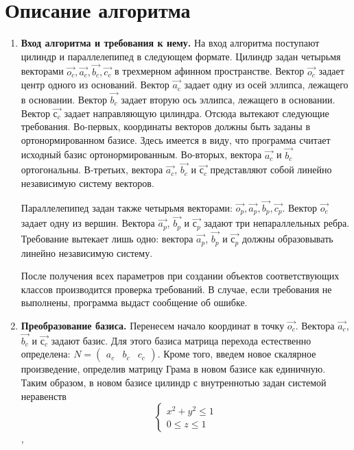 \documentclass[pdftex,ptm,12pt,a4paper]{report}
\begin{document}
\chapter{Описание алгоритма}
\begin{enumerate}
  \item 
      \textbf{Вход алгоритма и требования к нему.}
      На вход алгоритма поступают цилиндр и параллелепипед в следующем формате.
      Цилиндр задан четырьмя векторами $\vec{o_c}, \vec{a_c}, \vec{b_c}, \vec{c_c}$ в трехмерном афинном пространстве.
      Вектор $\vec{o_c}$ задает центр одного из оснований.
      Вектор $\vec{a_c}$ задает одну из осей эллипса, лежащего в основании.
      Вектор $\vec{b_c}$ задает вторую ось эллипса, лежащего в основании.
      Вектор $\vec{с_c}$ задает направляющую цилиндра.
      Отсюда вытекают следующие требования.
      Во-первых, координаты векторов должны быть заданы в ортонормированном базисе. 
      Здесь имеется в виду, что программа считает исходный базис ортонормированным.
      Во-вторых, вектора $\vec{a_c}$ и $\vec{b_c}$ ортогональны.
      В-третьих, вектора $\vec{a_c}$, $\vec{b_c}$ и $\vec{с_c}$ представляют собой линейно независимую систему векторов.

      Параллелепипед задан также четырьмя векторами: $\vec{o_p}, \vec{a_p}, \vec{b_p}, \vec{c_p}$.
      Вектор $\vec{o_c}$ задает одну из вершин.
      Вектора $\vec{a_p}$, $\vec{b_p}$ и $\vec{с_p}$ задают три непараллельных ребра.
      Требование вытекает лишь одно: вектора $\vec{a_p}$, $\vec{b_p}$ и $\vec{с_p}$ должны образовывать линейно независимую систему.

      После получения всех параметров при создании объектов соответствующих классов производится проверка требований. 
      В случае, если требования не выполнены, программа выдаст сообщение об ошибке.
  \item
    \textbf{Преобразование базиса.}
      Перенесем начало координат в точку $\vec{o_c}$. 
      Вектора $\vec{a_c}$, $\vec{b_c}$ и $\vec{с_c}$ задают базис.
      Для этого базиса матрица перехода естественно определена:
      $N = \begin{pmatrix} {a_c} & {b_c} & c_{c} \end{pmatrix}$.
      Кроме того, введем новое скалярное произведение, определив матрицу Грама в новом базисе как единичную.
      Таким образом, в новом базисе цилиндр с внутреннотью задан системой неравенств 
      \begin{equation}\label{cnb}
          \begin{cases}
          x^2 + y^2   \le  1  \\
          0 \le  z   \le  1
          \end{cases}
      \end{equation}, 


\end{enumerate}
\end{document}
